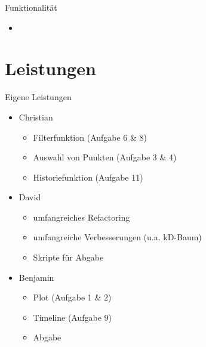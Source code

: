 \documentclass{beamer}
\begin{document}
    \begin{frame}{Funktionalität}
    	\begin{itemize}
    		\setlength\itemsep{1em}
    		\item 
    	\end{itemize}
    \end{frame}
    
    \section{Leistungen} 
    \begin{frame}{Eigene Leistungen}
    	\begin{itemize}
	    	\setlength\itemsep{1em}
	    	\item Christian
	    	\begin{itemize}
	    		\item Filterfunktion (Aufgabe 6 \& 8)
	    		\item Auswahl von Punkten (Aufgabe 3 \& 4)
	    		\item Historiefunktion (Aufgabe 11)
	    	\end{itemize}
    		\item David
    		\begin{itemize}
    			\item umfangreiches Refactoring
    			\item umfangreiche Verbesserungen (u.a. kD-Baum)
    			\item Skripte für Abgabe
    		\end{itemize}
    		\item Benjamin
    		\begin{itemize}
    			\item Plot (Aufgabe 1 \& 2)
    			\item Timeline (Aufgabe 9)
    			\item Abgabe
    		\end{itemize}
    	\end{itemize}
    \end{frame}
    
\end{document}
